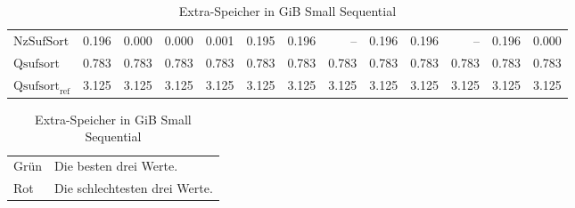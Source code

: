 \begin{table}[h]
{\begin{tabular}{lrrrrrrrrrrrr}
    $\text{NzSufSort}$ & 0.196 & {\color{green!60!black}0.000} & {\color{green!60!black}0.000} & 0.001 & 0.195 & 0.196 & {\color{darkgray}--} & 0.196 & 0.196 & {\color{darkgray}--} & 0.196 & 0.000 \\
    $\text{Qsufsort}$ & 0.783 & 0.783 & 0.783 & 0.783 & 0.783 & 0.783 & 0.783 & 0.783 & 0.783 & 0.783 & 0.783 & 0.783 \\
    $\text{Qsufsort}_{\text{ref}}$ & 3.125 & 3.125 & 3.125 & 3.125 & 3.125 & 3.125 & 3.125 & 3.125 & 3.125 & 3.125 & 3.125 & 3.125 \\
\bottomrule
\end{tabular}
}
\caption{Extra-Speicher in GiB Small Sequential}
\label{messung:tab:memory-small-seq-none}
\begin{tabular}{ll}
{\color{green}Grün} & Die besten drei Werte.\\
{\color{red}Rot} & Die schlechtesten drei Werte.\\
\end{tabular}
\end{table}
